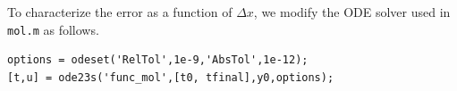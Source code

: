 \begin{itemize}
\begin{figure}[H]
  \centering
  \hfill
  \hfill
  \hfill
  \hfill
  \hfill
\end{figure}
  To characterize the error as a function of $\Delta x$,
  we modify the ODE solver used in \verb|mol.m| as follows.
\begin{verbatim}
options = odeset('RelTol',1e-9,'AbsTol',1e-12);
[t,u] = ode23s('func_mol',[t0, tfinal],y0,options);
\end{verbatim}


\end{itemize}
